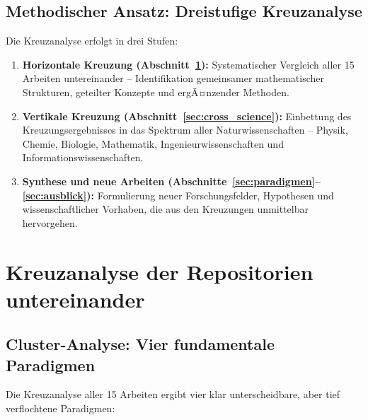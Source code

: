 ﻿\documentclass[a4paper,12pt]{scrreprt}
\theoremstyle{definition}
\begin{document}
\subsection{Methodischer Ansatz: Dreistufige Kreuzanalyse}

Die Kreuzanalyse erfolgt in drei Stufen:

\begin{enumerate}
  \item \textbf{Horizontale Kreuzung (Abschnitt~\ref{sec:cross_repos}):}
    Systematischer Vergleich aller 15 Arbeiten untereinander -- Identifikation
    gemeinsamer mathematischer Strukturen, geteilter Konzepte und ergÃ¤nzender Methoden.

  \item \textbf{Vertikale Kreuzung (Abschnitt~\ref{sec:cross_science}):}
    Einbettung des Kreuzungsergebnisses in das Spektrum aller Naturwissenschaften
    -- Physik, Chemie, Biologie, Mathematik, Ingenieurwissenschaften und
    Informationswissenschaften.

  \item \textbf{Synthese und neue Arbeiten (Abschnitte~\ref{sec:paradigmen}--\ref{sec:ausblick}):}
    Formulierung neuer Forschungsfelder, Hypothesen und wissenschaftlicher Vorhaben,
    die aus den Kreuzungen unmittelbar hervorgehen.
\end{enumerate}

\section{Kreuzanalyse der Repositorien untereinander}
\label{sec:cross_repos}

\subsection{Cluster-Analyse: Vier fundamentale Paradigmen}
\label{ssec:cluster}

Die Kreuzanalyse aller 15 Arbeiten ergibt vier klar unterscheidbare, aber
tief verflochtene Paradigmen:
\end{document}
